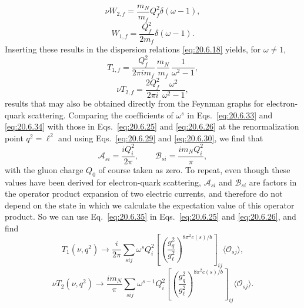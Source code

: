 \begin{equation}
\nu W_{2,f}
=\frac{m_N}{m_f}Q_f^2\delta(\omega-1),
\tag{20.6.31}\label{eq:20.6.31}
\end{equation}
\begin{equation}
W_{1,f}
=\frac{Q_f^2}{2m_f}\delta(\omega-1).
\tag{20.6.32}\label{eq:20.6.32}
\end{equation}
Inserting these results in the dispersion relations \eqref{eq:20.6.18} yields, for $\omega\ne1$,
\begin{equation}
T_{1,f}
=\frac{Q_f^2}{2\pi i m_f}\,
\frac{m_N}{m_f}\,
\frac{1}{\omega^2-1},
\tag{20.6.33}\label{eq:20.6.33}
\end{equation}
\begin{equation}
\nu T_{2,f}
=\frac{2Q_f^2}{2\pi i}\,
\frac{\omega^2}{\omega^2-1},
\tag{20.6.34}\label{eq:20.6.34}
\end{equation}
results that may also be obtained directly from the Feynman graphs for electron-quark scattering. Comparing the coefficients of $\omega^s$ in Eqs.~\eqref{eq:20.6.33} and \eqref{eq:20.6.34} with those in Eqs.~\eqref{eq:20.6.25} and \eqref{eq:20.6.26} at the renormalization point $q^2=\ell^2$ and using Eqs.~\eqref{eq:20.6.29} and \eqref{eq:20.6.30}, we find that
\begin{equation}
\mathcal A_{si}=\frac{iQ_i^2}{2\pi},
\qquad
\mathcal B_{si}=\frac{im_NQ_i^2}{\pi},
\tag{20.6.35}\label{eq:20.6.35}
\end{equation}
with the gluon charge $Q_0$ of course taken as zero. To repeat, even though these values have been derived for electron-quark scattering, $\mathcal A_{si}$ and $\mathcal B_{si}$ are factors in the operator product expansion of two electric currents, and therefore do not depend on the state in which we calculate the expectation value of this operator product. So we can use Eq.~\eqref{eq:20.6.35} in Eqs.~\eqref{eq:20.6.25} and \eqref{eq:20.6.26}, and find
\begin{equation}
T_1(\nu,q^2)\longrightarrow
\frac{i}{2\pi}\sum_{sij}\omega^sQ_i^2
\left[
\left(\frac{g_q^2}{g_\ell^2}\right)^{8\pi^2c(s)/b}
\right]_{ij}
\langle\mathcal O_{sj}\rangle,
\tag{20.6.36}\label{eq:20.6.36}
\end{equation}
\begin{equation}
\nu T_2(\nu,q^2)\longrightarrow
\frac{im_N}{\pi}\sum_{sij}\omega^{s-1}Q_i^2
\left[
\left(\frac{g_q^2}{g_\ell^2}\right)^{8\pi^2c(s)/b}
\right]_{ij}
\langle\mathcal O_{sj}\rangle.
\tag{20.6.37}\label{eq:20.6.37}
\end{equation}


